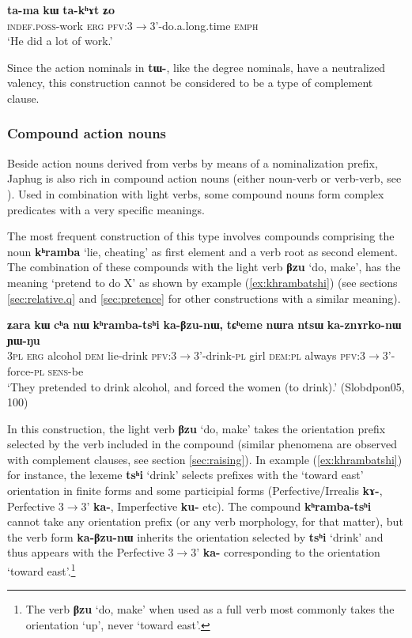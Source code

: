 \documentclass[oneside,a4paper,11pt]{article}
\newcommand{\ipa}[1]{\textbf{\phon#1}} %
\newcommand{\jpg}[2]{\ipa{#1} `#2'} %
\newcommand{\refb}[1]{(\ref{#1})}
\begin{document}
  \begin{exe}
\ex \label{ex:takhAt}
\gll 
\ipa{ta-ma}	\ipa{kɯ}	\ipa{ta-kʰɤt}	\ipa{ʑo} \\
\textsc{indef.poss}-work \textsc{erg} \textsc{pfv}:3$\rightarrow$3'-do.a.long.time \textsc{emph} \\
\glt  `He did a lot of work.'
\end{exe}

Since the action nominals in \ipa{tɯ-}, like the degree nominals, have a neutralized valency, this construction cannot be considered to be a type of complement clause.
 

 
\subsubsection{Compound action nouns} \label{sec:compound}
Beside action nouns derived from verbs by means of a nominalization prefix, Japhug is also rich in compound action nouns (either noun-verb or verb-verb, see \citealt{jacques12incorp}). Used in combination with light verbs, some compound nouns form complex predicates with a very specific meanings.

The most frequent construction of this type involves compounds comprising the noun \jpg{kʰramba}{lie, cheating} as first element and a verb root as second element. The combination of these compounds with the light verb \jpg{βzu}{do, make}, has the meaning `pretend to do X' as shown by example \refb{ex:khrambatshi} (see sections \ref{sec:relative.q} and \ref{sec:pretence} for other constructions with a similar meaning).

\begin{exe}
\ex \label{ex:khrambatshi}
 \gll 
\ipa{ʑara} 	\ipa{kɯ} 	\ipa{cʰa} 	\ipa{nɯ} 	\ipa{kʰramba-tsʰi} 	\ipa{ka-βzu-nɯ,} 	\ipa{tɕʰeme} 	\ipa{nɯra} 	\ipa{ntsɯ} 	\ipa{ka-znɤrko-nɯ} 	\ipa{ɲɯ-ŋu}  \\
\textsc{3pl} \textsc{erg} alcohol \textsc{dem} lie-drink \textsc{pfv}:3$\rightarrow$3'-drink-\textsc{pl} girl \textsc{dem:pl} always \textsc{pfv}:3$\rightarrow$3'-force-\textsc{pl}  \textsc{sens}-be \\
\glt  `They pretended to drink alcohol, and forced the women (to drink).' (Slobdpon05, 100)
\end{exe}

In this construction, the light verb \jpg{βzu}{do, make} takes the orientation prefix selected by the verb included in the compound (similar phenomena are observed with complement clauses, see section \ref{sec:raising}). In example \refb{ex:khrambatshi} for instance, the lexeme \jpg{tsʰi}{drink} selects prefixes with the `toward east' orientation in finite forms and some participial forms (Perfective/Irrealis \ipa{kɤ-}, Perfective 3$\rightarrow$3' \ipa{ka-}, Imperfective \ipa{ku-} etc). The compound  \ipa{kʰramba-tsʰi} cannot take any orientation prefix (or any verb morphology, for that matter), but the verb form \ipa{ka-βzu-nɯ} inherits the orientation selected by \jpg{tsʰi}{drink} and thus appears with the Perfective 3$\rightarrow$3' \ipa{ka-} corresponding to the orientation `toward east'.\footnote{The verb \jpg{βzu}{do, make} when used as a full verb most commonly takes the orientation `up', never `toward east'.}
\end{document}
